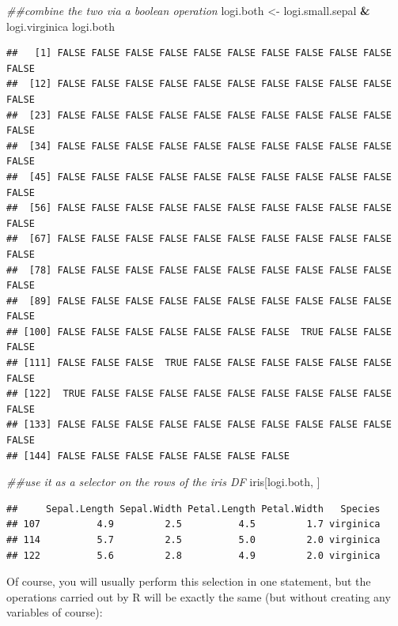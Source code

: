 \documentclass[]{book}
\newenvironment{Shaded}{\begin{snugshade}}{\end{snugshade}}
\newcommand{\CommentTok}[1]{\textcolor[rgb]{0.56,0.35,0.01}{\textit{#1}}}
\newcommand{\NormalTok}[1]{#1}
\newcommand{\OperatorTok}[1]{\textcolor[rgb]{0.81,0.36,0.00}{\textbf{#1}}}
\newcommand{\StringTok}[1]{\textcolor[rgb]{0.31,0.60,0.02}{#1}}
\begin{document}
\begin{Shaded}
\begin{Highlighting}[]
\CommentTok{##combine the two via a boolean operation}
\NormalTok{logi.both <-}\StringTok{ }\NormalTok{logi.small.sepal }\OperatorTok{&}\StringTok{ }\NormalTok{logi.virginica}
\NormalTok{logi.both}
\end{Highlighting}
\end{Shaded}

\begin{verbatim}
##   [1] FALSE FALSE FALSE FALSE FALSE FALSE FALSE FALSE FALSE FALSE FALSE
##  [12] FALSE FALSE FALSE FALSE FALSE FALSE FALSE FALSE FALSE FALSE FALSE
##  [23] FALSE FALSE FALSE FALSE FALSE FALSE FALSE FALSE FALSE FALSE FALSE
##  [34] FALSE FALSE FALSE FALSE FALSE FALSE FALSE FALSE FALSE FALSE FALSE
##  [45] FALSE FALSE FALSE FALSE FALSE FALSE FALSE FALSE FALSE FALSE FALSE
##  [56] FALSE FALSE FALSE FALSE FALSE FALSE FALSE FALSE FALSE FALSE FALSE
##  [67] FALSE FALSE FALSE FALSE FALSE FALSE FALSE FALSE FALSE FALSE FALSE
##  [78] FALSE FALSE FALSE FALSE FALSE FALSE FALSE FALSE FALSE FALSE FALSE
##  [89] FALSE FALSE FALSE FALSE FALSE FALSE FALSE FALSE FALSE FALSE FALSE
## [100] FALSE FALSE FALSE FALSE FALSE FALSE FALSE  TRUE FALSE FALSE FALSE
## [111] FALSE FALSE FALSE  TRUE FALSE FALSE FALSE FALSE FALSE FALSE FALSE
## [122]  TRUE FALSE FALSE FALSE FALSE FALSE FALSE FALSE FALSE FALSE FALSE
## [133] FALSE FALSE FALSE FALSE FALSE FALSE FALSE FALSE FALSE FALSE FALSE
## [144] FALSE FALSE FALSE FALSE FALSE FALSE FALSE
\end{verbatim}

\begin{Shaded}
\begin{Highlighting}[]
\CommentTok{##use it as a selector on the rows of the iris DF}
\NormalTok{iris[logi.both, ]}
\end{Highlighting}
\end{Shaded}

\begin{verbatim}
##     Sepal.Length Sepal.Width Petal.Length Petal.Width   Species
## 107          4.9         2.5          4.5         1.7 virginica
## 114          5.7         2.5          5.0         2.0 virginica
## 122          5.6         2.8          4.9         2.0 virginica
\end{verbatim}

Of course, you will usually perform this selection in one statement, but the operations carried out by R will be exactly the same (but without creating any variables of course):
\end{document}
